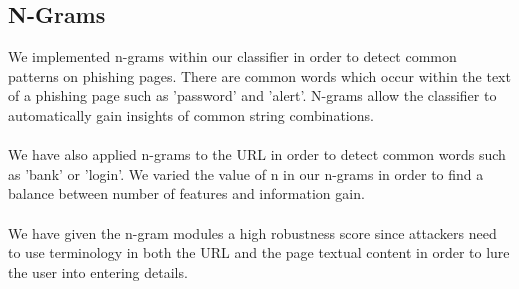 \documentclass[12pt,twoside]{report}
\begin{document}
\subsection{N-Grams}
We implemented n-grams within our classifier in order to detect common patterns on phishing pages. There are common words which occur within the text of a phishing page such as 'password' and 'alert'. N-grams allow the classifier to automatically gain insights of common string combinations.
\\\\
We have also applied n-grams to the URL in order to detect common words such as 'bank' or 'login'. We varied the value of n in our n-grams in order to find a balance between number of features and information gain.
\\\\
We have given the n-gram modules a high robustness score since attackers need to use terminology in both the URL and the page textual content in order to lure the user into entering details.
\clearpage
{}
\end{document}
